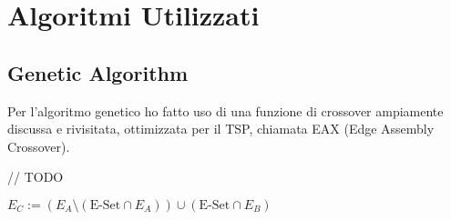 \documentclass{article}
\begin{document}
\section{Algoritmi Utilizzati}

\subsection{Genetic Algorithm}
Per l'algoritmo genetico ho fatto uso di una funzione di crossover ampiamente
discussa e rivisitata, ottimizzata per il TSP, chiamata EAX (Edge Assembly
Crossover).

// TODO

$E_C := (E_A \setminus (\text{E-Set} \cap E_A)) \cup (\text{E-Set} \cap E_B)$
\end{document}
